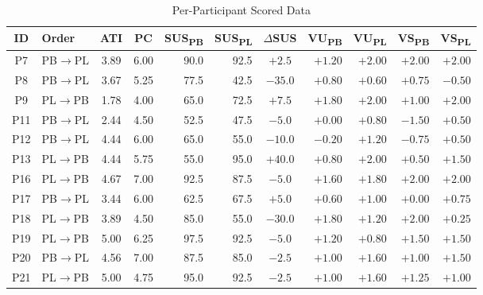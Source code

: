\documentclass{article}
\begin{document}
\begin{table}[htbp]
    \centering
    \begin{threeparttable}
        \caption{Per-Participant Scored Data}
        \label{tab:raw-data}
        \small
        \begin{tabular}{clccrrcrrrr}
            \toprule
            \textbf{ID} & \textbf{Order} & \textbf{ATI} & \textbf{PC} & \textbf{SUS\textsubscript{PB}} & \textbf{SUS\textsubscript{PL}} & \textbf{$\Delta$SUS} & \textbf{VU\textsubscript{PB}} & \textbf{VU\textsubscript{PL}} & \textbf{VS\textsubscript{PB}} & \textbf{VS\textsubscript{PL}} \\
            \midrule
            P7 & PB$\rightarrow$PL & 3.89 & 6.00 & 90.0 & 92.5 & $+2.5$ & $+1.20$ & $+2.00$ & $+2.00$ & $+2.00$ \\
            P8 & PB$\rightarrow$PL & 3.67 & 5.25 & 77.5 & 42.5 & $-35.0$ & $+0.80$ & $+0.60$ & $+0.75$ & $-0.50$ \\
            P9 & PL$\rightarrow$PB & 1.78 & 4.00 & 65.0 & 72.5 & $+7.5$ & $+1.80$ & $+2.00$ & $+1.00$ & $+2.00$ \\
            P11 & PB$\rightarrow$PL & 2.44 & 4.50 & 52.5 & 47.5 & $-5.0$ & $+0.00$ & $+0.80$ & $-1.50$ & $+0.50$ \\
            P12 & PB$\rightarrow$PL & 4.44 & 6.00 & 65.0 & 55.0 & $-10.0$ & $-0.20$ & $+1.20$ & $-0.75$ & $+0.50$ \\
            P13 & PL$\rightarrow$PB & 4.44 & 5.75 & 55.0 & 95.0 & $+40.0$ & $+0.80$ & $+2.00$ & $+0.50$ & $+1.50$ \\
            P16 & PL$\rightarrow$PB & 4.67 & 7.00 & 92.5 & 87.5 & $-5.0$ & $+1.60$ & $+1.80$ & $+2.00$ & $+2.00$ \\
            P17 & PB$\rightarrow$PL & 3.44 & 6.00 & 62.5 & 67.5 & $+5.0$ & $+0.60$ & $+1.00$ & $+0.00$ & $+0.75$ \\
            P18 & PL$\rightarrow$PB & 3.89 & 4.50 & 85.0 & 55.0 & $-30.0$ & $+1.80$ & $+1.20$ & $+2.00$ & $+0.25$ \\
            P19 & PL$\rightarrow$PB & 5.00 & 6.25 & 97.5 & 92.5 & $-5.0$ & $+1.20$ & $+0.80$ & $+1.50$ & $+1.50$ \\
            P20 & PB$\rightarrow$PL & 4.56 & 7.00 & 87.5 & 85.0 & $-2.5$ & $+1.00$ & $+1.60$ & $+1.00$ & $+1.50$ \\
            P21 & PL$\rightarrow$PB & 5.00 & 4.75 & 95.0 & 92.5 & $-2.5$ & $+1.00$ & $+1.60$ & $+1.25$ & $+1.00$ \\

\end{tabular}
\end{threeparttable}
\end{table}
\end{document}
